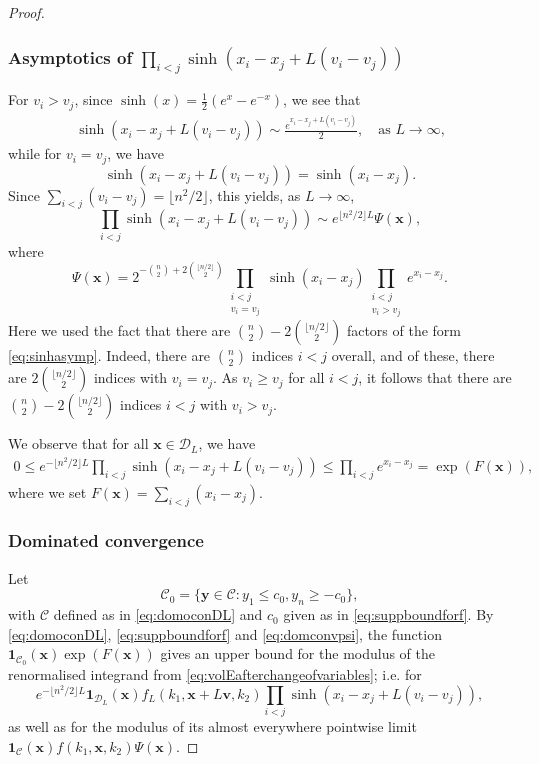 \documentclass[11pt,reqno]{amsart}
\theoremstyle{definition}
\theoremstyle{remark}
\numberwithin{equation}{section}
\numberwithin{thm}{section}
\numberwithin{table}{section}
\newcommand{\y}{\mathbf{y}}
\newcommand{\x}{\mathbf{x}}
\begin{document}
\begin{proof}
\subsubsection*{Asymptotics of $\prod_{i<j} \sinh(x_i-x_j + L(v_i-v_j))$} 
For $v_i > v_j $, since $\sinh(x) = \frac{1}{2}(e^x - e^{-x})$, we see that 
      \begin{align}\label{eq:sinhasymp}
          \sinh(x_i - x_j + L(v_i-v_j)) 
       \sim \frac{e^{x_i - x_j + L(v_i-v_j)}}{2}, \quad \text{as $L \to \infty$,}
      \end{align}
            while for $v_i = v_j$, we have
      \[
      \sinh(x_i - x_j + L(v_i-v_j)) = \sinh(x_i-x_j).
      \]
      Since $\sum_{i<j}(v_i-v_j) = \lfloor n^2/2 \rfloor$, this yields, as $L \to \infty$,   
      \[
      \prod_{i<j} \sinh(x_i - x_j + L(v_i-v_j)) \sim 
      e^{\lfloor n^2/2 \rfloor L} \Psi(\mathbf{x})
      ,
      \]
      where 
      \[
      \Psi(\mathbf{x}) = 2^{-\binom{n}{2}+2\binom{\lfloor n/2 \rfloor}{2}} \prod_{\substack{i < j \\ v_i = v_j}}
      \sinh(x_i-x_j)
      \prod_{\substack{i < j \\ v_i > v_j}} e^{x_i - x_j}.
      \]
    Here we used the fact that there are $\binom{n}{2}-2\binom{\lfloor n/2 \rfloor}{2}$
    factors of the form \eqref{eq:sinhasymp}. Indeed, there
    are $\binom{n}{2}$ indices $i<j$ overall, and of these, there are $2\binom{\lfloor n/2 \rfloor}{2}$ indices  with $v_i = v_j$. As $v_i \ge v_j$ for all $i<j$, it follows that there are $\binom{n}{2}-2\binom{\lfloor n/2 \rfloor}{2}$ indices $i<j$ with $v_i>v_j$.

      
      We observe that for all $\x \in \mathcal{D}_L$, we have
      \begin{align}\label{eq:domconvpsi}
      0 \le
          e^{-\lfloor n^2/2 \rfloor L}\prod_{i<j} \sinh(x_i - x_j + L(v_i-v_j)) \le \prod_{i<j} e^{x_i-x_j} =\exp(F(\x)),
      \end{align}
      where we set $F(\x)=\sum_{i<j}(x_i-x_j)$.

\subsubsection*{Dominated convergence} 
      Let 
      \[
      \mathcal{C}_0 = 
      \{ 
      \y \in \mathcal{C}:  y_1 \le c_0 , y_n  \ge -c_0
      \},
      \]
      with $\mathcal{C}$ defined as in \eqref{eq:domoconDL} and $c_0$ given as in \eqref{eq:suppboundforf}. By \eqref{eq:domoconDL},
      \eqref{eq:suppboundforf} and 
      \eqref{eq:domconvpsi},  the function 
      $\mathbf{1}_{\mathcal{C}_0} (\mathbf{x}) \exp(F(\x))$ gives an upper bound for the modulus of the renormalised integrand from  \eqref{eq:volEafterchangeofvariables}; i.e. for
      \[
       e^{-\lfloor n^2/2\rfloor L}
       \mathbf{1}_{\mathcal{D}_L}(\mathbf{x})
     f_L(k_1,\mathbf{x}+L\mathbf{v},k_2) 
      \prod_{i<j} \sinh(x_i - x_j + L(v_i-v_j)),
      \]
      as well as for the modulus of its almost everywhere pointwise limit 
      $
      \mathbf{1}_{\mathcal{C}}(\x)
     f(k_1,\mathbf{x},k_2)
      \Psi(\x)$.
      

\end{proof}
\end{document}
